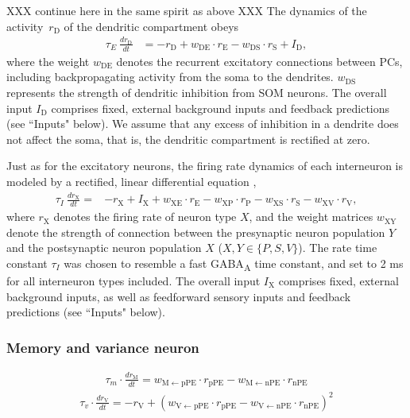 \documentclass[10pt,a4paper,draft]{article}
\begin{document}
XXX continue here in the same spirit as above XXX The dynamics of the activity~$r_\mathrm{D}$ of the dendritic compartment obeys \citep{wilson1972excitatory}
%
\begin{align}
\tau_E\ \frac{dr_\mathrm{D}}{dt} &= - r_\mathrm{D} +  w_\mathrm{DE}\cdot r_\mathrm{E}  - w_\mathrm{DS}\cdot r_\mathrm{S} + I_\mathrm{D},
\end{align}
%
where the weight $w_{\mathrm{DE}}$ denotes the recurrent excitatory connections between PCs, including backpropagating activity from the soma to the dendrites. $w_{\mathrm{DS}}$ represents the strength of dendritic inhibition from SOM neurons. The overall input $I_\mathrm{D}$ comprises fixed, external background inputs and feedback predictions (see ``Inputs" below). We assume that any excess of inhibition in a dendrite does not affect the soma, that is, the dendritic compartment is rectified at zero. 

Just as for the excitatory neurons, the firing rate dynamics of each interneuron is modeled by a rectified, linear differential equation \citep{wilson1972excitatory},
%
\begin{align}
\label{eq:RateEqINs}
\tau_I\ \frac{dr_\mathrm{X}}{dt} =& - r_\mathrm{X} + I_{\mathrm{X}} + w_\mathrm{XE}\cdot r_\mathrm{E} - w_\mathrm{XP}\cdot r_\mathrm{P}  - w_\mathrm{XS}\cdot r_\mathrm{S} -  w_\mathrm{XV}\cdot r_\mathrm{V}, 
\end{align}
%
where $r_\mathrm{X}$ denotes the firing rate of neuron type $X$, and the weight matrices $w_\mathrm{XY}$ denote the strength of connection between the presynaptic neuron population $Y$ and the postsynaptic neuron population $X$ ($X, Y\in \lbrace P,S,V\rbrace$). The rate time constant $\tau_I$ was chosen to resemble a fast GABA\textsubscript{A} time constant, and set to 2 ms for all interneuron types included. The overall input $I_\mathrm{X}$ comprises fixed, external background inputs, as well as feedforward sensory inputs and feedback predictions (see ``Inputs" below).

\subsubsection*{Memory and variance neuron}
%
\begin{align}
\tau_m \cdot \frac{dr_\mathrm{M}}{dt} = w_\mathrm{M\leftarrow pPE} \cdot r_\mathrm{pPE} - w_\mathrm{M\leftarrow nPE} \cdot r_\mathrm{nPE} 
\end{align}
%
\begin{align}
\tau_v \cdot \frac{dr_\mathrm{V}}{dt} = -r_\mathrm{V} + (w_\mathrm{V\leftarrow pPE} \cdot r_\mathrm{pPE} - w_\mathrm{V\leftarrow nPE} \cdot r_\mathrm{nPE})^2 
\end{align}
\end{document}
